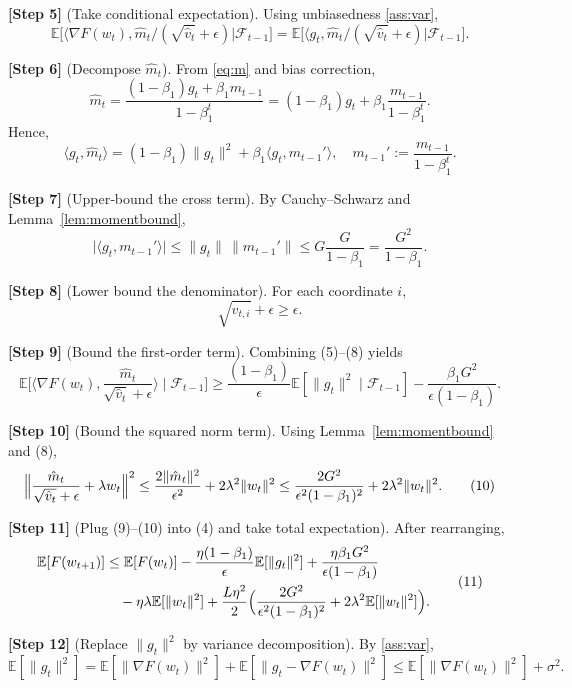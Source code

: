 \documentclass{article}
\newcommand{\E}{\mathbb{E}}
\begin{document}
\noindent\textbf{[Step 5]} (Take conditional expectation). Using unbiasedness \eqref{ass:var},
\[
\E\!\bigl[\langle\nabla F(w_t),\hat m_t/(\sqrt{\hat v_t}+\epsilon)\bigr|\mathcal{F}_{t-1}]
= \E\!\bigl[\langle g_t,\hat m_t/(\sqrt{\hat v_t}+\epsilon)\bigr|\mathcal{F}_{t-1}].
\tag{5}
\]

\noindent\textbf{[Step 6]} (Decompose $\hat m_t$). From \eqref{eq:m} and bias correction,
\[
\hat m_t = \frac{(1-\beta_1)g_t + \beta_1 m_{t-1}}{1-\beta_1^{t}}
= (1-\beta_1)g_t + \beta_1\frac{m_{t-1}}{1-\beta_1^{t}} .
\]
Hence,
\[
\langle g_t,\hat m_t\rangle = (1-\beta_1)\|g_t\|^2
+ \beta_1\langle g_t,m_{t-1}'\rangle,
\quad
m_{t-1}' := \frac{m_{t-1}}{1-\beta_1^{t}} .
\tag{6}
\]

\noindent\textbf{[Step 7]} (Upper‑bound the cross term). By Cauchy–Schwarz and Lemma~\ref{lem:momentbound},
\[
\bigl|\langle g_t,m_{t-1}'\rangle\bigr|
\le \|g_t\|\,\|m_{t-1}'\|
\le G\frac{G}{1-\beta_1}
= \frac{G^2}{1-\beta_1}.
\tag{7}
\]

\noindent\textbf{[Step 8]} (Lower bound the denominator). For each coordinate $i$,
\[
\sqrt{\hat v_{t,i}}+\epsilon \ge \epsilon .
\tag{8}
\]

\noindent\textbf{[Step 9]} (Bound the first‑order term). Combining (5)–(8) yields
\[
\E\!\bigl[\langle\nabla F(w_t),\frac{\hat m_t}{\sqrt{\hat v_t}+\epsilon}\rangle\mid\mathcal{F}_{t-1}\bigr]
\ge \frac{(1-\beta_1)}{\epsilon}\E[\|g_t\|^2\mid\mathcal{F}_{t-1}]
-\frac{\beta_1 G^2}{\epsilon(1-\beta_1)} .
\tag{9}
\]

\noindent\textbf{[Step 10]} (Bound the squared norm term). Using Lemma~\ref{lem:momentbound} and (8),
\[
\Bigl\|\frac{\hat m_t}{\sqrt{\hat v_t}+\epsilon}+\lambda w_t\Bigr\|^2
\le
\frac{2\|\hat m_t\|^2}{\epsilon^2}+2\lambda^2\|w_t\|^2
\le
\frac{2G^2}{\epsilon^2(1-\beta_1)^2}+2\lambda^2\|w_t\|^2 .
\tag{10}
\]

\noindent\textbf{[Step 11]} (Plug (9)–(10) into (4) and take total expectation). After rearranging,
\[
\begin{aligned}
\E[F(w_{t+1})] &\le \E[F(w_t)]
- \frac{\eta(1-\beta_1)}{\epsilon}\E[\|g_t\|^2]
+ \frac{\eta\beta_1 G^2}{\epsilon(1-\beta_1)} \\
&\quad -\eta\lambda\E[\|w_t\|^2]
+\frac{L\eta^2}{2}\Bigl(
\frac{2G^2}{\epsilon^2(1-\beta_1)^2}+2\lambda^2\E[\|w_t\|^2]\Bigr).
\end{aligned} \tag{11}
\]

\noindent\textbf{[Step 12]} (Replace $\|g_t\|^2$ by variance decomposition). By \eqref{ass:var},
\[
\E[\|g_t\|^2]=\E[\|\nabla F(w_t)\|^2]+\E[\|g_t-\nabla F(w_t)\|^2]
\le \E[\|\nabla F(w_t)\|^2]+\sigma^2 .
\tag{12}
\]
\end{document}
